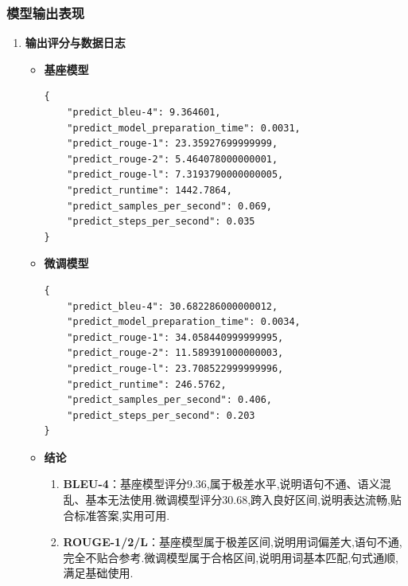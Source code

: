 \documentclass[12pt]{ctexart}
\begin{document}
\subsubsection{模型输出表现}

\begin{enumerate}

    \item \textbf{输出评分与数据日志}

          \begin{itemize}

              \item \textbf{基座模型}

                    \begin{lstlisting}
{
    "predict_bleu-4": 9.364601,
    "predict_model_preparation_time": 0.0031,
    "predict_rouge-1": 23.35927699999999,
    "predict_rouge-2": 5.464078000000001,
    "predict_rouge-l": 7.3193790000000005,
    "predict_runtime": 1442.7864,
    "predict_samples_per_second": 0.069,
    "predict_steps_per_second": 0.035
}
                    \end{lstlisting}

              \item \textbf{微调模型}

                    \begin{lstlisting}
{
    "predict_bleu-4": 30.682286000000012,
    "predict_model_preparation_time": 0.0034,
    "predict_rouge-1": 34.058440999999995,
    "predict_rouge-2": 11.589391000000003,
    "predict_rouge-l": 23.708522999999996,
    "predict_runtime": 246.5762,
    "predict_samples_per_second": 0.406,
    "predict_steps_per_second": 0.203
}
                    \end{lstlisting}

              \item \textbf{结论}

                    \begin{enumerate}

                        \item \textbf{BLEU-4}：基座模型评分9.36,属于极差水平,说明语句不通、语义混乱、基本无法使用.微调模型评分30.68,跨入良好区间,说明表达流畅,贴合标准答案,实用可用.

                        \item \textbf{ROUGE-1/2/L}：基座模型属于极差区间,说明用词偏差大,语句不通,完全不贴合参考.微调模型属于合格区间,说明用词基本匹配,句式通顺,满足基础使用.


\end{enumerate}
\end{itemize}
\end{enumerate}
\end{document}
